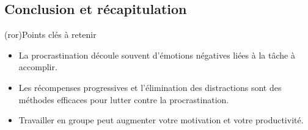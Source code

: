 \documentclass[a4paper, 12pt, garamond]{book}
\begin{document}
%
%

\subsection{Conclusion et récapitulation}

\begin{tcn}(ror){Points clés à retenir}
	\begin{itemize}
		\item La procrastination découle souvent d'émotions négatives liées à la
		      tâche à accomplir.
		\item Les récompenses progressives et l'élimination des distractions sont
		      des méthodes efficaces pour lutter contre la procrastination.
		\item Travailler en groupe peut augmenter votre motivation et votre
		      productivité.
	\end{itemize}
\end{tcn}
\end{document}
